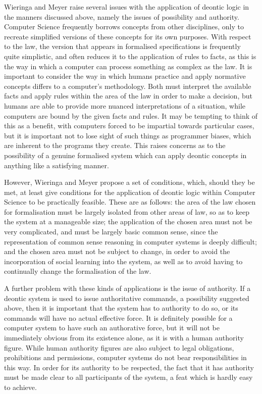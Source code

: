\documentclass{l4proj}
\begin{document}
Wieringa and Meyer raise several issues with the application of deontic logic in the manners discussed above, namely the issues of possibility and authority. Computer Science frequently borrows concepts from other disciplines, only to recreate simplified versions of these concepts for its own purposes. With respect to the law, the version that appears in formalised specifications is frequently quite simplistic, and often reduces it to the application of rules to facts, as this is the way in which a computer can process something as complex as the law. It is important to consider the way in which humans practice and apply normative concepts differs to a computer's methodology. Both must interpret the available facts and apply rules within the area of the law in order to make a decision, but humans are able to provide more nuanced interpretations of a situation, while computers are bound by the given facts and rules. It may be tempting to think of this as a benefit, with computers forced to be impartial towards particular cases, but it is important not to lose sight of such things as programmer biases, which are inherent to the programs they create. This raises concerns as to the possibility of a genuine formalised system which can apply deontic concepts in anything like a satisfying manner. 

However, Wieringa and Meyer propose a set of conditions, which, should they be met, at least give conditions for the application of deontic logic within Computer Science to be practically feasible. These are as follows: the area of the law chosen for formalisation must be largely isolated from other areas of law, so as to keep the system at a manageable size; the application of the chosen area must not be very complicated, and must be largely basic common sense, since the representation of common sense reasoning in computer systems is deeply difficult; and the chosen area must not be subject to change, in order to avoid the incorporation of social learning into the system, as well as to avoid having to continually change the formalisation of the law. 

A further problem with these kinds of applications is the issue of authority. If a deontic system is used to issue authoritative commands, a possibility suggested above, then it is important that the system has to authority to do so, or its commands will have no actual effective force. It is definitely possible for a computer system to have such an authorative force, but it will not be immediately obvious from its existence alone, as it is with a human authority figure. While human authority figures are also subject to legal obligations, prohibitions and permissions, computer systems do not bear responsibilities in this way. In order for its authority to be respected, the fact that it has authority must be made clear to all participants of the system, a feat which is hardly easy to achieve. 
\end{document}
